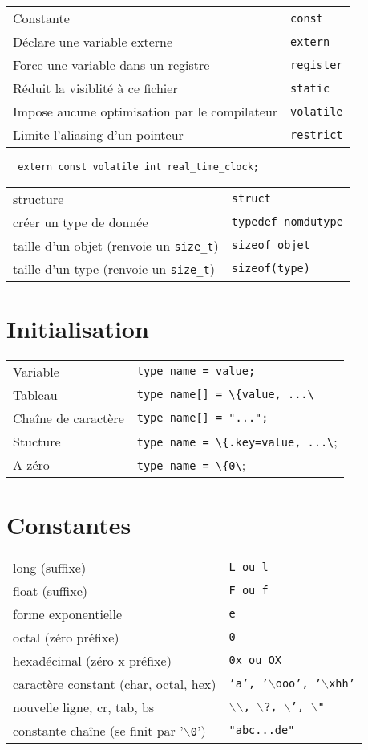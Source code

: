 \documentclass{article}
\newcommand{\key}[2]{#1 &\texttt{#2} \\ }
\newcommand{\bs}{$\backslash$}
\newenvironment{keylist}
     {\noindent\begin{tabular*}{\linewidth}{ll}} %
     {\end{tabular*}}
\newcommand{\cd}{\lstinline}
\begin{document}
\begin{multicols*}{3}
\begin{tabularx}{\linewidth}{Xl}
  Constante                           & \cd{const} \\
  Déclare une variable externe        & \cd{extern} \\
  Force une variable dans un registre & \cd{register} \\
  Réduit la visiblité à ce fichier    & \cd{static} \\
  Impose aucune optimisation par le compilateur & \cd{volatile} \\
  Limite l'aliasing d'un pointeur     & \cd{restrict} \\
\end{tabularx}

\begin{lstlisting}
  extern const volatile int real_time_clock;
\end{lstlisting}

\begin{keylist}

\key{structure}{struct}
\key{créer un type de donnée}{typedef \texttt{nomdutype}}
\key{taille d'un objet (renvoie un \texttt{size\_t})}{sizeof \texttt{objet}}
\key{taille d'un type (renvoie un \texttt{size\_t})}{sizeof(\texttt{type)}}
\end{keylist}

\section*{Initialisation}
\begin{tabularx}{\linewidth}{Xl}
  Variable & \cd{type name = value;} \\
  Tableau & \cd{type name[] = \{value, ...\}}; \\
  Chaîne de caractère & \cd{type name[] = "...";} \\
  Stucture & \cd{type name = \{.key=value, ...\};} \\
  A zéro & \cd{type name = \{0\};} \\
\end{tabularx}

\section*{Constantes}
\begin{keylist}
\key{long (suffixe)}{L \textrm{ou} l}
\key{float (suffixe)}{F \textrm{ou} f}
\key{forme exponentielle}{e}
\key{octal (zéro préfixe)}{0}
\key{hexadécimal (zéro x préfixe)}{0x \textrm{ou} OX}
\key{caractère constant (char, octal, hex)}{'a', '\bs\texttt{ooo}', '\bs{}x\texttt{hh}'}
\key{nouvelle ligne, cr, tab, bs}{\bs\bs{}, \bs?, \bs', \bs"}
\key{constante chaîne (se finit par '\texttt{\bs{}0}')}{"abc...de"}
\end{keylist}


\end{multicols*}
\end{document}
